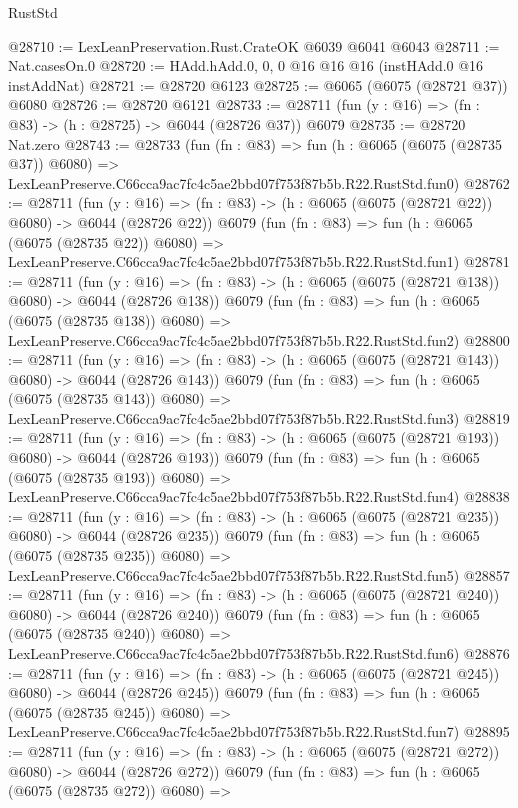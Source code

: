 \begin{lexlean}{RustStd}
\begin{coremodule}
@28710 := LexLeanPreservation.Rust.CrateOK @6039 @6041 @6043
@28711 := Nat.casesOn.{0}
@28720 := HAdd.hAdd.{0, 0, 0} @16 @16 @16 (instHAdd.{0} @16 instAddNat)
@28721 := @28720 @6123
@28725 := @6065 (@6075 (@28721 @37)) @6080
@28726 := @28720 @6121
@28733 := @28711 (fun (y : @16) => (fn : @83) -> (h : @28725) -> @6044 (@28726 @37)) @6079
@28735 := @28720 Nat.zero
@28743 := @28733
    (fun (fn : @83) =>
    fun (h : @6065 (@6075 (@28735 @37)) @6080) =>
    LexLeanPreserve.C66cca9ac7fc4c5ae2bbd07f753f87b5b.R22.RustStd.fun0)
@28762 := @28711
    (fun (y : @16) => (fn : @83) -> (h : @6065 (@6075 (@28721 @22)) @6080) -> @6044 (@28726 @22))
    @6079
    (fun (fn : @83) =>
    fun (h : @6065 (@6075 (@28735 @22)) @6080) =>
    LexLeanPreserve.C66cca9ac7fc4c5ae2bbd07f753f87b5b.R22.RustStd.fun1)
@28781 := @28711
    (fun (y : @16) => (fn : @83) -> (h : @6065 (@6075 (@28721 @138)) @6080) -> @6044 (@28726 @138))
    @6079
    (fun (fn : @83) =>
    fun (h : @6065 (@6075 (@28735 @138)) @6080) =>
    LexLeanPreserve.C66cca9ac7fc4c5ae2bbd07f753f87b5b.R22.RustStd.fun2)
@28800 := @28711
    (fun (y : @16) => (fn : @83) -> (h : @6065 (@6075 (@28721 @143)) @6080) -> @6044 (@28726 @143))
    @6079
    (fun (fn : @83) =>
    fun (h : @6065 (@6075 (@28735 @143)) @6080) =>
    LexLeanPreserve.C66cca9ac7fc4c5ae2bbd07f753f87b5b.R22.RustStd.fun3)
@28819 := @28711
    (fun (y : @16) => (fn : @83) -> (h : @6065 (@6075 (@28721 @193)) @6080) -> @6044 (@28726 @193))
    @6079
    (fun (fn : @83) =>
    fun (h : @6065 (@6075 (@28735 @193)) @6080) =>
    LexLeanPreserve.C66cca9ac7fc4c5ae2bbd07f753f87b5b.R22.RustStd.fun4)
@28838 := @28711
    (fun (y : @16) => (fn : @83) -> (h : @6065 (@6075 (@28721 @235)) @6080) -> @6044 (@28726 @235))
    @6079
    (fun (fn : @83) =>
    fun (h : @6065 (@6075 (@28735 @235)) @6080) =>
    LexLeanPreserve.C66cca9ac7fc4c5ae2bbd07f753f87b5b.R22.RustStd.fun5)
@28857 := @28711
    (fun (y : @16) => (fn : @83) -> (h : @6065 (@6075 (@28721 @240)) @6080) -> @6044 (@28726 @240))
    @6079
    (fun (fn : @83) =>
    fun (h : @6065 (@6075 (@28735 @240)) @6080) =>
    LexLeanPreserve.C66cca9ac7fc4c5ae2bbd07f753f87b5b.R22.RustStd.fun6)
@28876 := @28711
    (fun (y : @16) => (fn : @83) -> (h : @6065 (@6075 (@28721 @245)) @6080) -> @6044 (@28726 @245))
    @6079
    (fun (fn : @83) =>
    fun (h : @6065 (@6075 (@28735 @245)) @6080) =>
    LexLeanPreserve.C66cca9ac7fc4c5ae2bbd07f753f87b5b.R22.RustStd.fun7)
@28895 := @28711
    (fun (y : @16) => (fn : @83) -> (h : @6065 (@6075 (@28721 @272)) @6080) -> @6044 (@28726 @272))
    @6079
    (fun (fn : @83) =>
    fun (h : @6065 (@6075 (@28735 @272)) @6080) =>

\end{coremodule}
\end{lexlean}
